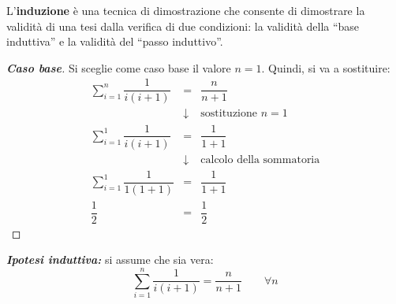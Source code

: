 \documentclass[a4paper]{article}
\newcommand{\dquotes}[1]{``#1''}
\begin{document}
	\noindent
	L'\textbf{induzione} è una tecnica di dimostrazione che consente di dimostrare la validità di una tesi dalla verifica di due condizioni: la validità della \dquotes{base induttiva} e la validità del \dquotes{passo induttivo}.
	\begin{proof}[\textbf{Caso base}]
		Si sceglie come caso base il valore $n = 1$. Quindi, si va a sostituire:
		\begin{equation*}
			\begin{array}{rcl}
				\displaystyle\sum_{i=1}^{n}\dfrac{1}{i\left(i+1\right)} &=& \dfrac{n}{n+1} \\ [1.5em]
				&\downarrow& \text{sostituzione }n=1 \\ [.5em]
				\displaystyle\sum_{i=1}^{1}\dfrac{1}{i\left(i+1\right)} &=& \dfrac{1}{1+1} \\ [1.5em]
				&\downarrow& \text{calcolo della sommatoria} \\ [.5em]
				\displaystyle\sum_{i=1}^{1}\dfrac{1}{1\left(1+1\right)} &=& \dfrac{1}{1+1} \\ [1.5em]
				\dfrac{1}{2} &=& \dfrac{1}{2}
			\end{array}
		\end{equation*}
	\end{proof}
	
	\noindent
	\textbf{\emph{Ipotesi induttiva:}} si assume che sia vera:
	\begin{equation*}
		\displaystyle\sum_{i=1}^{n}\dfrac{1}{i\left(i+1\right)} = \dfrac{n}{n+1} \hspace{2em} \forall n
	\end{equation*}
	
\end{document}
